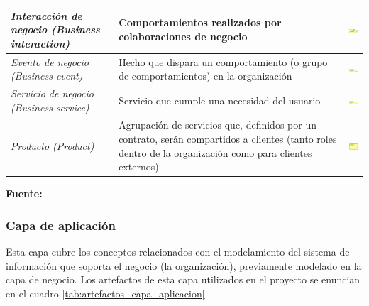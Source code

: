 \begin{center}
\begin{longtable}{|p{4cm}|p{6cm}|c|}
	\hline
	\textit{Interacción de negocio (Business interaction)} & 
    Comportamientos realizados por colaboraciones de negocio &  
    \includegraphics[width=1.5cm]{./imagenes/Archimate/artefactos/businessinteraction.png}\\
	\hline
	\textit{Evento de negocio (Business event)} & 
    Hecho que dispara un comportamiento (o grupo de comportamientos) en la organización &  
    \includegraphics[width=1.5cm]{./imagenes/Archimate/artefactos/businessevent.png}\\
	\hline
	\textit{Servicio de negocio (Business service)} & 
    Servicio que cumple una necesidad del usuario &  
    \includegraphics[width=1.5cm]{./imagenes/Archimate/artefactos/businessservice.png}\\
	\hline
	\textit{Producto (Product)} & 
    Agrupación de servicios que, definidos por un contrato, serán compartidos a clientes (tanto roles dentro de la organización como para clientes externos) &  
    \includegraphics[width=1.5cm]{./imagenes/Archimate/artefactos/businessproduct.png}\\
	\hline
  \end{longtable}
  \textbf{Fuente:} \cite{archimate2}
\end{center}

\subsubsection{Capa de aplicación} 

Esta capa cubre los conceptos relacionados con el modelamiento del sistema de información que soporta el negocio (la organización), previamente modelado en la capa de negocio. Los artefactos de esta capa utilizados en el proyecto se enuncian en el cuadro \ref{tab:artefactos_capa_aplicacion}.

